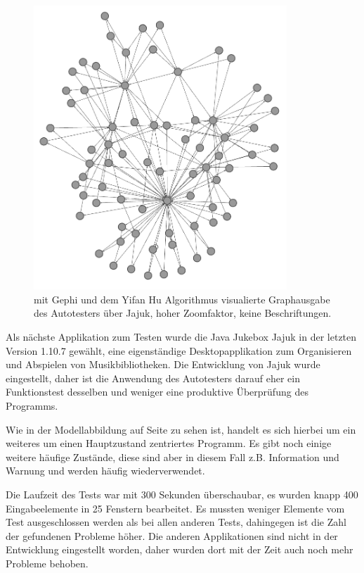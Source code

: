\begin{figure}
	\centering
	\includegraphics[width=0.85\textwidth]{bilder/model_jajuk_notext.png}
	\caption{mit Gephi und dem Yifan Hu Algorithmus\cite{hu2005efficient}
    visualierte Graphausgabe des Autotesters über Jajuk, hoher Zoomfaktor, keine Beschriftungen.}
	\label{jajukmodel}
\end{figure}


Als nächste Applikation zum Testen wurde die Java Jukebox \glqq{}Jajuk\grqq{}
in der letzten Version 1.10.7 gewählt,
eine eigenständige Desktopapplikation zum Organisieren
und Abspielen von Musikbibliotheken. Die Entwicklung von
Jajuk wurde eingestellt, daher ist die Anwendung des
Autotesters darauf eher ein Funktionstest desselben
und weniger eine produktive Überprüfung des Programms.

Wie in der Modellabbildung auf Seite \pageref{jajukmodel} zu sehen ist, handelt es sich hierbei
um ein weiteres um einen Hauptzustand zentriertes Programm. Es gibt noch
einige weitere häufige Zustände, diese sind aber in diesem Fall z.B.
\glqq{}Information\grqq{}  und \glqq{}Warnung\grqq{} und
werden häufig wiederverwendet.

Die Laufzeit des Tests war mit 300 Sekunden überschaubar,
es wurden knapp 400 Eingabeelemente in 25 Fenstern bearbeitet.
Es mussten weniger Elemente vom Test ausgeschlossen werden
als bei allen anderen Tests, dahingegen ist die Zahl der gefundenen
Probleme höher. Die anderen Applikationen sind nicht
in der Entwicklung eingestellt worden, daher wurden
dort mit der Zeit auch noch mehr Probleme behoben.



